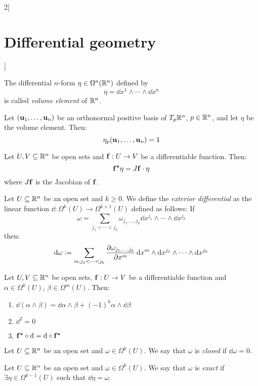\documentclass[../../../main_math.tex]{subfiles}
\begin{document}
\begin{multicols}{2}[\section{Differential geometry}]
\begin{proposition}
  \end{proposition}
  \begin{definition}
    The differential $n$-form $\eta\in\Omega^n(\mathbb{R}^n)$ defined by $$\eta=\dd{x^1}\wedge\cdots\wedge\dd{x^n}$$ is called \emph{volume element} of $\mathbb{R}^n$.
  \end{definition}
  \begin{lemma}
    Let $(\boldsymbol{\mathrm{u}}_1,\ldots,\boldsymbol{\mathrm{u}}_n)$ be an orthonormal positive basis of $T_p\mathbb{R}^n$, $p\in\mathbb{R}^n$, and let $\eta$ be the volume element. Then: $$\eta_p(\boldsymbol{\mathrm{u}}_1,\ldots,\boldsymbol{\mathrm{u}}_n)=1$$
  \end{lemma}
  \begin{proposition}
    Let $U,V\subseteq\mathbb{R}^n$ be open sets and $\boldsymbol{\mathrm{f}}:U\rightarrow V$ be a differentiable function. Then: $$\boldsymbol{\mathrm{f^*}}\eta=J\boldsymbol{\mathrm{f}}\cdot\eta$$ where $J\boldsymbol{\mathrm{f}}$ is the Jacobian of $\boldsymbol{\mathrm{f}}$.
  \end{proposition}
  \begin{definition}
    Let $U\subseteq\mathbb{R}^n$ be an open set and $k\geq 0$. We define the \emph{exterior differential} as the linear function $\dd:\Omega^k(U)\rightarrow\Omega^{k+1}(U)$ defined as follows: If $$\omega=\sum_{j_1<\cdots<j_k}\omega_{j_1,\ldots,j_k}\dd{x^{j_1}}\wedge\cdots\wedge\dd{x^{j_k}}$$
    then: $$\dd{\omega}:=\sum_{m,j_1<\cdots<j_k}\pdv{\omega_{j_1,\ldots,j_k}}{x^m}\dd{x^m}\wedge\dd{x^{j_1}}\wedge\cdots\wedge\dd{x^{j_k}}$$
  \end{definition}
  \begin{proposition}
    Let $U,V\subseteq\mathbb{R}^n$ be open sets, $\boldsymbol{\mathrm{f}}:U\rightarrow V$ be a differentiable function and $\alpha\in\Omega^k(U)$, $\beta\in\Omega^m(U)$. Then:
    \begin{enumerate}
      \item $\dd{(\alpha\wedge\beta)}=\dd{\alpha}\wedge\beta+{(-1)}^k\alpha\wedge\dd{\beta}$
      \item $\dd^2=0$
      \item $\boldsymbol{\mathrm{f^*}}\circ\dd{}=\dd{}\circ\boldsymbol{\mathrm{f^*}}$
    \end{enumerate}
  \end{proposition}
  \begin{definition}
    Let $U\subseteq\mathbb{R}^n$ be an open set and $\omega\in\Omega^k(U)$. We say that $\omega$ is \emph{closed} if $\dd{\omega}=0$.
  \end{definition}
  \begin{definition}
    Let $U\subseteq\mathbb{R}^n$ be an open set and $\omega\in\Omega^k(U)$. We say that $\omega$ is \emph{exact} if $\exists \eta\in\Omega^{k-1}(U)$ such that $\dd{\eta}=\omega$.
  \end{definition}

\end{multicols}
\end{document}
